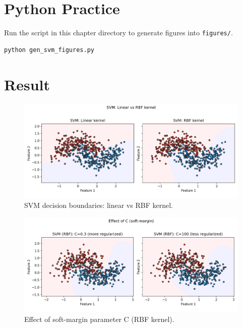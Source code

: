 \documentclass[11pt]{article}
\begin{document}
\section{Python Practice}
Run the script in this chapter directory to generate figures into \texttt{figures/}.
\begin{lstlisting}[style=code,caption={Generate SVM figures},label={lst:genfigs_svm}]
python gen_svm_figures.py
\end{lstlisting}



\section{Result}
\begin{figure}[H]
  \centering
  \includegraphics[width=0.95\linewidth]{svm_linear_vs_rbf.png}
  \caption{SVM decision boundaries: linear vs RBF kernel.}
  \label{fig:svm_lin_rbf}
\end{figure}
\FloatBarrier

\begin{figure}[H]
  \centering
  \includegraphics[width=0.95\linewidth]{svm_C_compare.png}
  \caption{Effect of soft-margin parameter C (RBF kernel).}
  \label{fig:svm_c}
\end{figure}
\FloatBarrier
\end{document}
